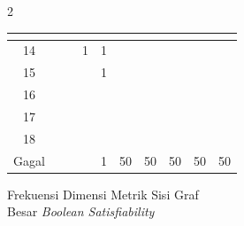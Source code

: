 \documentclass[12pt]{article}
\newcommand{\foreign}[1]{\textit{#1}}
\begin{document}
{\begin{multicols}{2}
{\begin{tabular}{|c|lllllllll|}
\multicolumn{1}{r|}{} & \multicolumn{1}{r|}{} & \multicolumn{1}{r|}{} & \multicolumn{1}{r|}{} & \\ \hline 14 & \multicolumn{1}{r|}{} & \multicolumn{1}{r|}{} & \multicolumn{1}{r|}{1} & \multicolumn{1}{r|}{1} & \multicolumn{1}{r|}{} & \multicolumn{1}{r|}{} & \multicolumn{1}{r|}{} & \multicolumn{1}{r|}{} & \\ \hline 15 & \multicolumn{1}{r|}{} & \multicolumn{1}{r|}{} & \multicolumn{1}{r|}{} & \multicolumn{1}{r|}{1} & \multicolumn{1}{r|}{} & \multicolumn{1}{r|}{} & \multicolumn{1}{r|}{} & \multicolumn{1}{r|}{} & \\ \hline 16 & \multicolumn{1}{r|}{} & \multicolumn{1}{r|}{} & \multicolumn{1}{r|}{} & \multicolumn{1}{r|}{} & \multicolumn{1}{r|}{} & \multicolumn{1}{r|}{} & \multicolumn{1}{r|}{} & \multicolumn{1}{r|}{} & \\ \hline 17 & \multicolumn{1}{r|}{} & \multicolumn{1}{r|}{} & \multicolumn{1}{r|}{} & \multicolumn{1}{r|}{} & \multicolumn{1}{r|}{} & \multicolumn{1}{r|}{} & \multicolumn{1}{r|}{} & \multicolumn{1}{r|}{} & \\ \hline 18 & \multicolumn{1}{r|}{} & \multicolumn{1}{r|}{} & \multicolumn{1}{r|}{} & \multicolumn{1}{r|}{} & \multicolumn{1}{r|}{} & \multicolumn{1}{r|}{} & \multicolumn{1}{r|}{} & \multicolumn{1}{r|}{} & \\ \hline Gagal & \multicolumn{1}{r|}{} & \multicolumn{1}{r|}{} & \multicolumn{1}{r|}{} & \multicolumn{1}{r|}{1} & \multicolumn{1}{r|}{50} & \multicolumn{1}{r|}{50} & \multicolumn{1}{r|}{50} & \multicolumn{1}{r|}{50} & 50 \\ \hline
		\end{tabular}
	}

	Frekuensi Dimensi Metrik Sisi Graf\\ Besar \foreign{Boolean Satisfiability}


\end{multicols}}
\end{document}
